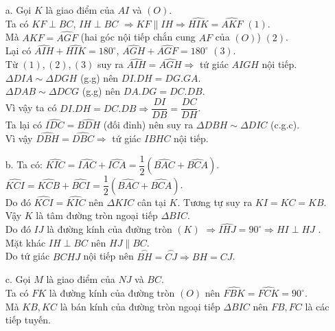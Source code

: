 \begin{ex}
{	\begin{itemize}
		\item[a.] Gọi $K$ là giao điểm của $AI$ và $(O)$. 
		\\ Ta có $KF \perp BC$, $IH \perp BC$ $\Rightarrow KF \parallel IH \Rightarrow \widehat{HIK} = \widehat{AKF}$ $(1)$.
		\\ Mà $\widehat{AKF} = \widehat{AGF}$ (hai góc nội tiếp chắn cung $AF$ của $(O)$) $(2)$.
		\\ Lại có $\widehat{AIH} +\widehat{HIK} = 180^\circ$, $\widehat{AGH} + \widehat{AGF} =180^\circ$ $(3)$.
		\\ Từ $(1), (2), (3)$ suy ra $\widehat{AIH} = \widehat{AGH} \Rightarrow$ tứ giác $AIGH$ nội tiếp.
		\\ $\Delta DIA \sim \Delta DGH$ (g.g) nên $DI.DH=DG.GA$.
		\\ $\Delta DAB \sim \Delta DCG$ (g.g) nên $DA.DG=DC.DB$.
		\\ Vì vậy ta có $DI.DH=DC.DB \Rightarrow \dfrac{DI}{DB} = \dfrac{DC}{DH}$.
		\\ Ta lại có $\widehat{IDC} =\widehat{BDH}$ (đối đỉnh) nên suy ra $\Delta DBH \sim \Delta DIC$ (c.g.c).
		\\ Vì vậy $\widehat{DBH} = \widehat{DBC} \Rightarrow$ tứ giác $IBHC$ nội tiếp.
		\item[b.] Ta có: $\widehat{KIC} = \widehat{IAC} + \widehat{ICA} = \dfrac{1}{2} \left(\widehat{BAC} + \widehat{BCA} \right)$.
		\\ $\widehat{KCI}= \widehat{KCB}+ \widehat{BCI} = \dfrac{1}{2} \left(\widehat{BAC} + \widehat{BCA} \right)$.
		\\ Do đó $\widehat{KCI} = \widehat{KIC}$ nên $\Delta KIC$ cân tại $K$. Tương tự suy ra $KI=KC=KB$.
		\\ Vậy $K$ là tâm đường tròn ngoại tiếp $\Delta BIC$.
		\\ Do đó $IJ$ là đường kính của đường tròn $(K)$ $\Rightarrow \widehat{IHJ}=90^\circ \Rightarrow HI \perp HJ$ . 
		\\ Mặt khác $IH \perp BC$ nên $HJ \parallel BC$.
		\\ Do tứ giác $BCHJ$ nội tiếp nên $\overset{\frown}{BH} =\overset{\frown}{CJ} \Rightarrow BH=CJ$.
		\item[c.] Gọi $M$ là giao điểm của $NJ$ và $BC$. 
		\\ Ta có $FK$ là đường kính của đường tròn $(O)$ nên $\widehat{FBK}= \widehat{FCK} = 90^\circ$.
		\\ Mà $KB,KC$ là bán kính của đường tròn ngoại tiếp $\Delta BIC$ nên $FB,FC$ là các tiếp tuyến.

\end{itemize}}
\end{ex}
